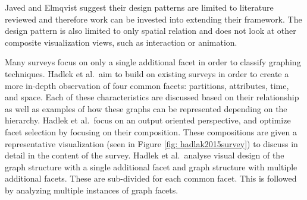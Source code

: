 %
%
%

Javed and Elmqvist suggest their design patterns are limited to literature reviewed and therefore work can be invested into extending their framework. The design pattern is also limited to only spatial relation and does not look at other composite visualization views, such as interaction or animation.

Many surveys focus on only a single additional facet in order to classify graphing techniques. Hadlek et al.\ aim to build on existing surveys in order to create a more in-depth observation of four common facets: partitions, attributes, time, and space. Each of these characteristics are discussed based on their relationship as well as examples of how these graphs can be represented depending on the hierarchy.
Hadlek et al.\ focus on an output oriented perspective, and optimize facet selection by focusing on their composition. These compositions are given a representative visualization (seen in Figure \ref{fig: hadlak2015survey}) to discuss in detail in the content of the survey. Hadlek et al.\ analyse visual design of the graph structure with a single additional facet and graph structure with multiple additional facets. These are sub-divided for each common facet. This is followed by analyzing multiple instances of graph facets.

